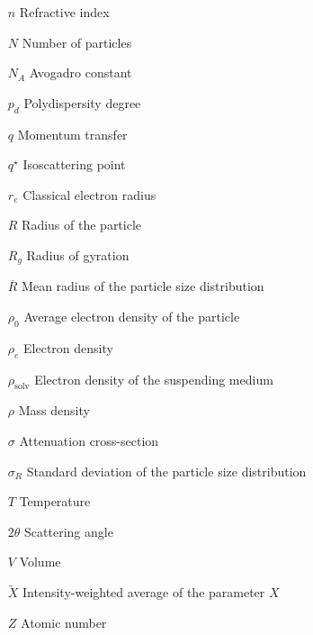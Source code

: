 \begin{itemize}
        \item[$n$] Refractive index        
        \item[$N$] Number of particles
        \item[$N_A$] Avogadro constant
        \item[$p_d$] Polydispersity degree
        \item[$q$] Momentum transfer 
        \item[$q^{\star}$] Isoscattering point
        \item[$r_e$] Classical electron radius          
        \item[$R$] Radius of the particle 
        \item[$R_g$] Radius of gyration 
        \item[$\overline{R}$] Mean radius of the particle size distribution
        \item[$\rho_0$] Average electron density of the particle
        \item[$\rho_e$] Electron density
        \item[$\rho_{\text{solv}}$] Electron density of the suspending medium
        \item[$\rho$] Mass density
        \item[$\sigma$] Attenuation cross-section
        \item[$\sigma_R$] Standard deviation of the particle size distribution
        \item[$T$] Temperature  
        \item[2$\theta$] Scattering angle
        \item[$V$] Volume
        \item[$\tilde X$] Intensity-weighted average of the parameter $X$
        \item[$Z$] Atomic number

\end{itemize}

\cleardoublepage
